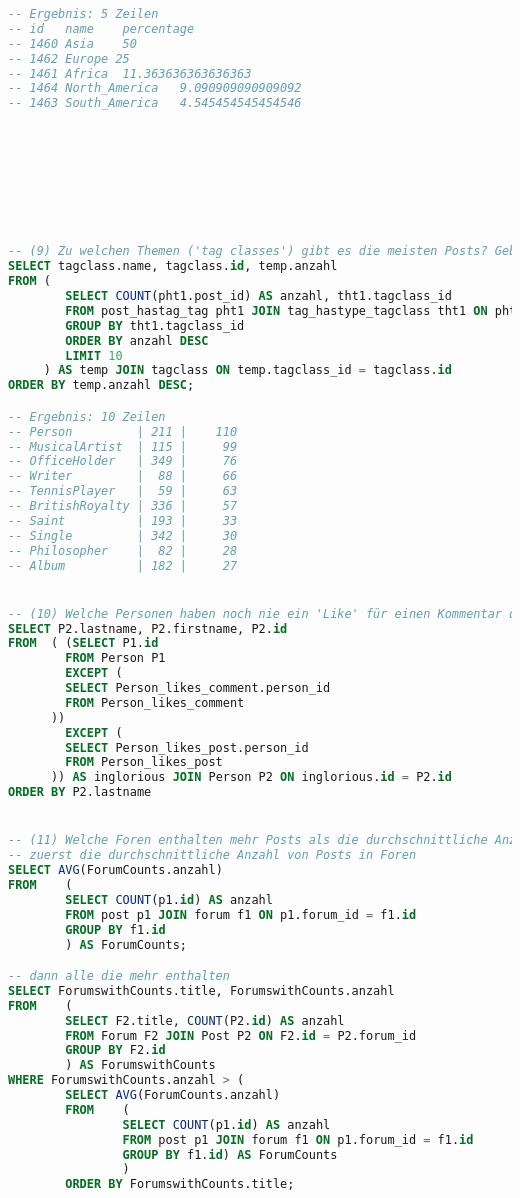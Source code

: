 \begin{lstlisting}[language=sql]
-- Ergebnis: 5 Zeilen
-- id 	name 	percentage
-- 1460 Asia	50
-- 1462	Europe 25
-- 1461 Africa	11.363636363636363
-- 1464 North_America	9.090909090909092
-- 1463 South_America	4.545454545454546








-- (9) Zu welchen Themen ('tag classes') gibt es die meisten Posts? Geben Sie die Namen der Top 10 'tag classes' mit ihrer Häufigkeit aus!
SELECT tagclass.name, tagclass.id, temp.anzahl
FROM (
        SELECT COUNT(pht1.post_id) AS anzahl, tht1.tagclass_id
        FROM post_hastag_tag pht1 JOIN tag_hastype_tagclass tht1 ON pht1.tag_id = tht1.tag_id
        GROUP BY tht1.tagclass_id
        ORDER BY anzahl DESC
        LIMIT 10
     ) AS temp JOIN tagclass ON temp.tagclass_id = tagclass.id
ORDER BY temp.anzahl DESC;

-- Ergebnis: 10 Zeilen
-- Person         | 211 |    110
-- MusicalArtist  | 115 |     99
-- OfficeHolder   | 349 |     76
-- Writer         |  88 |     66
-- TennisPlayer   |  59 |     63
-- BritishRoyalty | 336 |     57
-- Saint          | 193 |     33
-- Single         | 342 |     30
-- Philosopher    |  82 |     28
-- Album          | 182 |     27


-- (10) Welche Personen haben noch nie ein 'Like' für einen Kommentar oder Post bekommen? Sortieren Sie die Ausgabe alphabetisch nach dem Nachnamen.
SELECT P2.lastname, P2.firstname, P2.id
FROM  ( (SELECT P1.id
        FROM Person P1
        EXCEPT (
        SELECT Person_likes_comment.person_id
        FROM Person_likes_comment
      ))
        EXCEPT (
        SELECT Person_likes_post.person_id
        FROM Person_likes_post
      )) AS inglorious JOIN Person P2 ON inglorious.id = P2.id
ORDER BY P2.lastname


-- (11) Welche Foren enthalten mehr Posts als die durchschnittliche Anzahl von Posts in Foren (Ausgabe alphabetisch sortiert nach Forumtitel)?
-- zuerst die durchschnittliche Anzahl von Posts in Foren
SELECT AVG(ForumCounts.anzahl)
FROM    (
        SELECT COUNT(p1.id) AS anzahl
        FROM post p1 JOIN forum f1 ON p1.forum_id = f1.id
        GROUP BY f1.id
        ) AS ForumCounts;

-- dann alle die mehr enthalten
SELECT ForumswithCounts.title, ForumswithCounts.anzahl
FROM    (
        SELECT F2.title, COUNT(P2.id) AS anzahl
        FROM Forum F2 JOIN Post P2 ON F2.id = P2.forum_id
        GROUP BY F2.id
        ) AS ForumswithCounts
WHERE ForumswithCounts.anzahl > (
        SELECT AVG(ForumCounts.anzahl)
        FROM    (
                SELECT COUNT(p1.id) AS anzahl
                FROM post p1 JOIN forum f1 ON p1.forum_id = f1.id
                GROUP BY f1.id) AS ForumCounts
                )
        ORDER BY ForumswithCounts.title;


\end{lstlisting}

